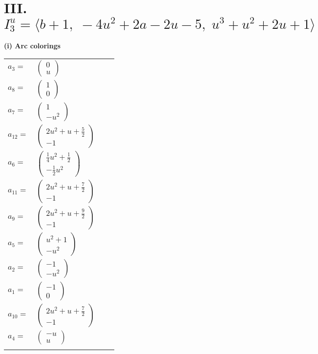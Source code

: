 \documentclass[1p]{elsarticle_modified}
\theoremstyle{definition}
\begin{document}
\centering \section*{III. $I^u_{3}= \langle b+1,\;-4 u^2+2 a-2 u-5,\;u^3+u^2+2 u+1 \rangle$}
\flushleft \textbf{(i) Arc colorings}\\
\begin{tabular}{m{7pt} m{180pt} m{7pt} m{180pt} }
\flushright $a_{3}=$&$\begin{pmatrix}0\\u\end{pmatrix}$ \\
\flushright $a_{8}=$&$\begin{pmatrix}1\\0\end{pmatrix}$ \\
\flushright $a_{7}=$&$\begin{pmatrix}1\\- u^2\end{pmatrix}$ \\
\flushright $a_{12}=$&$\begin{pmatrix}2 u^2+u+\frac{5}{2}\\-1\end{pmatrix}$ \\
\flushright $a_{6}=$&$\begin{pmatrix}\frac{1}{4} u^2+\frac{1}{2}\\-\frac{1}{2} u^2\end{pmatrix}$ \\
\flushright $a_{11}=$&$\begin{pmatrix}2 u^2+u+\frac{7}{2}\\-1\end{pmatrix}$ \\
\flushright $a_{9}=$&$\begin{pmatrix}2 u^2+u+\frac{9}{2}\\-1\end{pmatrix}$ \\
\flushright $a_{5}=$&$\begin{pmatrix}u^2+1\\- u^2\end{pmatrix}$ \\
\flushright $a_{2}=$&$\begin{pmatrix}-1\\- u^2\end{pmatrix}$ \\
\flushright $a_{1}=$&$\begin{pmatrix}-1\\0\end{pmatrix}$ \\
\flushright $a_{10}=$&$\begin{pmatrix}2 u^2+u+\frac{7}{2}\\-1\end{pmatrix}$ \\
\flushright $a_{4}=$&$\begin{pmatrix}- u\\u\end{pmatrix}$\\&\end{tabular}
\end{document}
